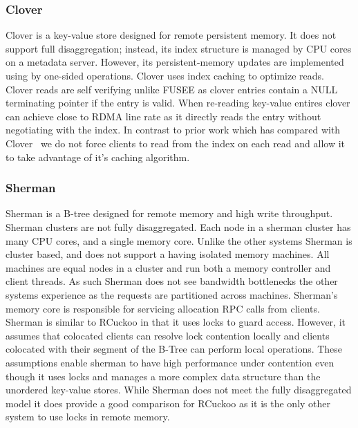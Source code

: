 \subsubsection{Clover}

Clover is a key-value store designed for remote persistent memory. It
does not support full disaggregation; instead, its index structure is
managed by CPU cores on a metadata server. However, its
persistent-memory updates are implemented using by one-sided
operations. Clover uses index caching to optimize reads. Clover reads
are self verifying unlike FUSEE as clover entries contain a NULL
terminating pointer if the entry is valid. When re-reading key-value
entires clover can achieve close to RDMA line rate as it directly
reads the entry without negotiating with the index. In contrast to
prior work which has compared with Clover~\cite{fusee} we do not force
clients to read from the index on each read and allow it to take
advantage of it's caching algorithm.

\subsubsection{Sherman}

Sherman is a B-tree designed for remote memory and high
write throughput. Sherman clusters are not fully
disaggregated.  Each node in a sherman cluster has many CPU
cores, and a single memory core. Unlike the other systems
Sherman is cluster based, and does not support a having
isolated memory machines. All machines are equal nodes in a
cluster and run both a memory controller and client threads.
As such Sherman does not see bandwidth bottlenecks the other
systems experience as the requests are partitioned across
machines.  Sherman's memory core is responsible for
servicing allocation RPC calls from clients. Sherman is
similar to RCuckoo in that it uses locks to guard access.
However, it assumes that colocated clients can resolve lock
contention locally and clients colocated with their segment
of the B-Tree can perform local operations. These
assumptions enable sherman to have high performance under
contention even though it uses locks and manages a more
complex data structure than the unordered key-value stores.
While Sherman does not meet the fully disaggregated model it
does provide a good comparison for RCuckoo as it is the only
other system to use locks in remote memory.



